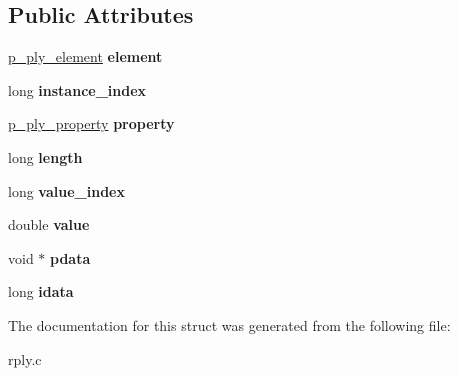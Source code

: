 \subsection*{Public Attributes}
\begin{DoxyCompactItemize}
\item 
\mbox{\label{structt__ply__argument___a958bc37961f8ee44b39f72f0b221c0d7}} 
\hyperlink{structt__ply__element__}{p\+\_\+ply\+\_\+element} {\bfseries element}
\item 
\mbox{\label{structt__ply__argument___ab0d8232410a2a77eb842892f3dddcb08}} 
long {\bfseries instance\+\_\+index}
\item 
\mbox{\label{structt__ply__argument___af38f3661a7ba2930c910027bd36790c4}} 
\hyperlink{structt__ply__property__}{p\+\_\+ply\+\_\+property} {\bfseries property}
\item 
\mbox{\label{structt__ply__argument___aaa7b3d7dca197835d72adaf12f9ec1ed}} 
long {\bfseries length}
\item 
\mbox{\label{structt__ply__argument___a5b407c90440ee9f5a14b8816808cb658}} 
long {\bfseries value\+\_\+index}
\item 
\mbox{\label{structt__ply__argument___ab4b092f2a002c13a39c251051d620b31}} 
double {\bfseries value}
\item 
\mbox{\label{structt__ply__argument___a33ffaef6d9affc8dd4322fff0856fd3e}} 
void $\ast$ {\bfseries pdata}
\item 
\mbox{\label{structt__ply__argument___a17560fa022ed7b8cffd9db501177a514}} 
long {\bfseries idata}
\end{DoxyCompactItemize}


The documentation for this struct was generated from the following file\+:\begin{DoxyCompactItemize}
\item 
rply.\+c\end{DoxyCompactItemize}
